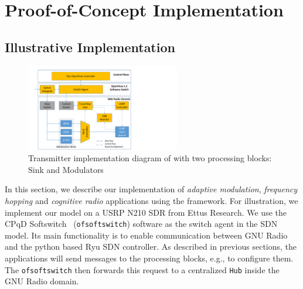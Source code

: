 \section{Proof-of-Concept Implementation}
\label{sec:evaluation}

\subsection{Illustrative \crossflow Implementation}
\begin{figure}[t]
  \centering
  \includegraphics[width=0.6\textwidth]{figures/Flowgraph.pdf}
  \caption{Transmitter implementation diagram of \crossflow with two processing blocks: Sink and Modulators}
  \label{fig:flowgraph}
\end{figure}

In this section, we describe our implementation of \emph{adaptive modulation}, \emph{frequency hopping} and \emph{cognitive radio} applications using the \crossflow framework. For illustration, we implement our model on a USRP N210 SDR from Ettus Research. We use the CPqD Softswitch~\cite{ofsoftswitch13} (\texttt{ofsoftswitch}) software as the switch agent in the SDN model. Its main functionality is to enable communication between GNU Radio and the python based Ryu SDN controller. As described in previous sections, the applications will send messages to the processing blocks, e.g., to configure them. The \texttt{ofsoftswitch} then forwards this request to a centralized \texttt{\crossflow Hub} inside the GNU Radio domain. 

